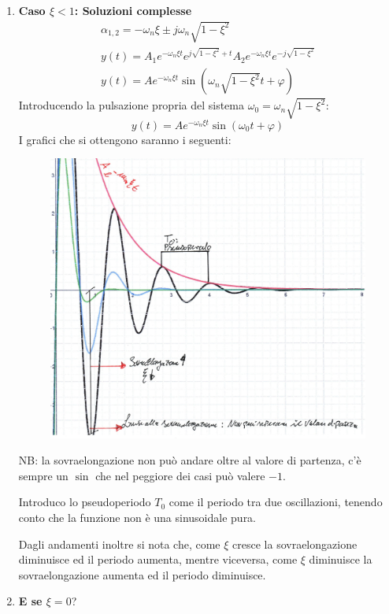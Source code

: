 \documentclass[a4paper, 15pt]{article}
\begin{document}
\begin{adjustwidth}{2in}{}
\begin{enumerate}[label=(\Roman*)]
\begin{figure}[H]
	\label{fig:mm10}
\end{figure}
	\item \textbf{Caso $\xi<1$: Soluzioni complesse}  
	\begin{eqnarray}
		\alpha_{1,2}= -\omega_n\xi \pm j\omega_n\sqrt{1 - \xi^2} \\
		y(t) = A_1e^{-\omega_n\xi t}e^{j\sqrt{1 - \xi^2}+ t}  A_2e^{-\omega_n\xi t}e^{-j\sqrt{1 - \xi^2}} \\
		y(t) = Ae^{-\omega_n\xi t}\sin(\omega_n\sqrt{1 - \xi^2}t + \varphi)
	\end{eqnarray}
	Introducendo la pulsazione propria del sistema \( \omega_0 = \omega_n\sqrt{1 - \xi^2} \):
	\[y(t) = Ae^{-\omega_n\xi t}\sin(\omega_0t + \varphi)\]
	I grafici che si ottengono saranno i seguenti: 
\begin{figure}[H]
	\centering
	\includegraphics[width=0.5\linewidth]{fig/mm11}
	\label{fig:mm11}
\end{figure}
	NB: la sovraelongazione non può andare oltre al valore di partenza, c'è sempre un $\sin$ che nel peggiore dei casi può valere $-1$. 
	
	Introduco lo pseudoperiodo $T_0$ come il periodo tra due oscillazioni, tenendo conto che la funzione non è una sinusoidale pura. \newline 
	
	Dagli andamenti inoltre si nota che, come $\xi$ cresce la sovraelongazione diminuisce ed il periodo aumenta, mentre viceversa, come $\xi$ diminuisce la sovraelongazione aumenta ed il periodo diminuisce. \newline 
	
	\item \textbf{E se $\xi=0$}? 
	

\end{enumerate}
\end{adjustwidth}
\end{document}
